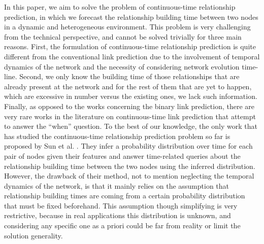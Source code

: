 In this paper, we aim to solve the problem of continuous-time relationship prediction, in which we forecast the relationship building time between two nodes in a dynamic and heterogeneous environment. This problem is very challenging from the technical perspective, and cannot be solved trivially for three main reasons. First, the formulation of continuous-time relationship prediction is quite different from the conventional link prediction due to the involvement of temporal dynamics of the network and the necessity of considering network evolution time-line. Second, we only know the building time of those relationships that are already present at the network and for the rest of them that are yet to happen, which are excessive in number versus the existing ones, we lack such information. Finally, as opposed to the works concerning the binary link prediction, there are very rare works in the literature on continuous-time link prediction that attempt to answer the ``when'' question. To the best of our knowledge, the only work that has studied the continuous-time relationship prediction problem so far is proposed by Sun et al. \cite{sun2012will}. They infer a probability distribution over time for each pair of nodes given their features and answer time-related queries about the relationship building time between the two nodes using the inferred distribution. However, the drawback of their method, not to mention neglecting the temporal dynamics of the network, is that it mainly relies on the assumption that relationship building times are coming from a certain probability distribution that must be fixed beforehand. This assumption though simplifying is very restrictive, because in real applications this distribution is unknown, and considering any specific one as a priori could be far from reality or limit the solution generality.

